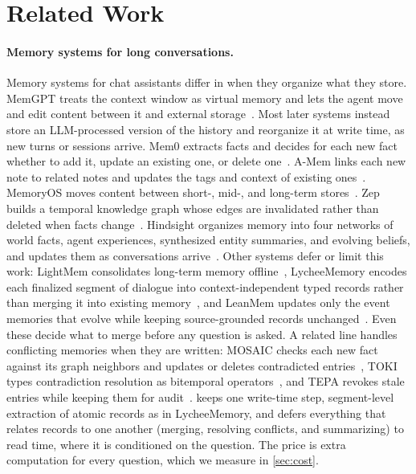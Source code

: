 \section{Related Work}
\label{sec:related}

\paragraph{Memory systems for long conversations.}
Memory systems for chat assistants differ in when they organize what they store. MemGPT treats the context window as
virtual memory and lets the agent move and edit content between it and external storage~\citep{packer2023memgpt}.
Most later systems instead store an LLM-processed version of the history and reorganize it at write time, as new turns
or sessions arrive. Mem0 extracts facts and decides for each new fact whether to add it, update an existing one, or
delete one~\citep{chhikara2025mem0}. A-Mem links each new note to related notes and updates the tags and context of
existing ones~\citep{xu2025amem}. MemoryOS moves content between short-, mid-, and long-term
stores~\citep{kang2025memoryos}. Zep builds a temporal knowledge graph whose edges are invalidated rather than deleted
when facts change~\citep{rasmussen2025zep}. Hindsight organizes memory into four networks of world facts, agent
experiences, synthesized entity summaries, and evolving beliefs, and updates them as conversations
arrive~\citep{latimer2025hindsight}. Other systems defer or limit this work: LightMem consolidates long-term memory
offline~\citep{fang2025lightmem}, LycheeMemory encodes each finalized segment of dialogue into context-independent
typed records rather than merging it into existing memory~\citep{li2026lychee}, and LeanMem updates only the event
memories that evolve while keeping source-grounded records unchanged~\citep{liao2026leanmem}. Even these decide what to
merge before any question is asked. A related line handles conflicting memories when they are written: MOSAIC checks
each new fact against its graph neighbors and updates or deletes contradicted entries~\citep{zhao2026mosaic}, TOKI
types contradiction resolution as bitemporal operators~\citep{wang2026toki}, and TEPA revokes stale entries while
keeping them for audit~\citep{zhou2026tepa}. \method{} keeps one write-time step, segment-level extraction of atomic records as
in LycheeMemory, and defers everything that relates records to one another (merging, resolving conflicts, and
summarizing) to read time, where it is conditioned on the question. The price is extra computation for every
question, which we measure in \cref{sec:cost}.

